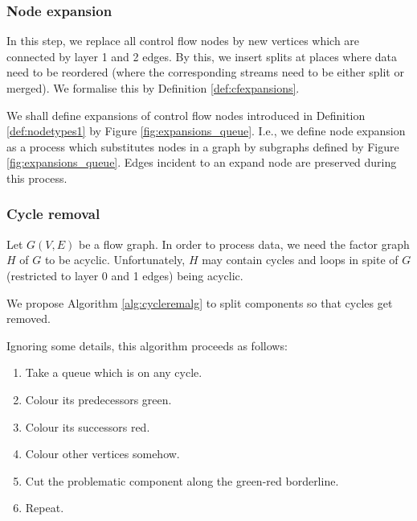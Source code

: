 \subsubsection{Node expansion}

In this step, we replace all control flow nodes by new vertices which are connected by layer 1 and 2 edges. By this, we insert splits at places where data need to be reordered (where the corresponding streams need to be either split or merged). We formalise this by Definition \ref{def:cfexpansions}.

We shall define expansions of control flow nodes introduced in Definition \ref{def:nodetypes1} by Figure \ref{fig:expansions_queue}. I.e., we define node expansion as a process which substitutes nodes in a graph by subgraphs defined by Figure \ref{fig:expansions_queue}. Edges incident to an expand node are preserved during this process.
\myenddef

\subsubsection{Cycle removal}

Let $G(V,E)$ be a flow graph. In order to process data, we need the factor graph $H$ of $G$ to be acyclic. Unfortunately, $H$ may contain cycles and loops in spite of $G$ (restricted to layer 0 and 1 edges) being acyclic. 


We propose Algorithm \ref{alg:cycleremalg} to split components so that cycles get removed. 

Ignoring some details, this algorithm proceeds as follows:
\begin{enumerate}
  \item Take a queue which is on any cycle.
  \item Colour its predecessors green.
  \item Colour its successors red.
  \item Colour other vertices somehow.
  \item Cut the problematic component along the green-red borderline.
  \item Repeat.
\end{enumerate}

